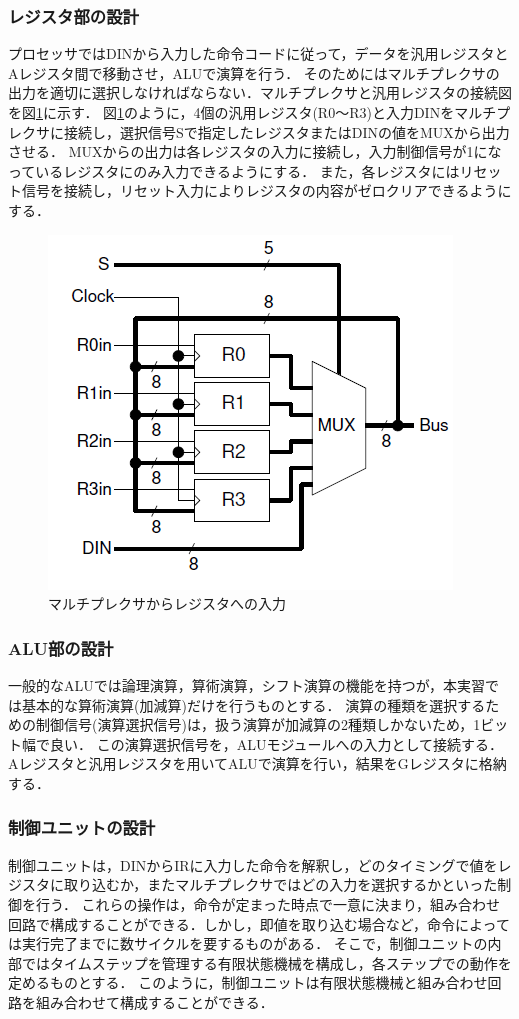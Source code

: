 \documentclass{jlreq}
\numberwithin{equation}{section}
\begin{document}
\subsubsection{レジスタ部の設計}
プロセッサではDINから入力した命令コードに従って，データを汎用レジスタとAレジスタ間で移動させ，ALUで演算を行う．
そのためにはマルチプレクサの出力を適切に選択しなければならない．マルチプレクサと汎用レジスタの接続図を図\ref{fig:mux_to_register}に示す．
図\ref{fig:mux_to_register}のように，4個の汎用レジスタ(R0～R3)と入力DINをマルチプレクサに接続し，選択信号Sで指定したレジスタまたはDINの値をMUXから出力させる．
MUXからの出力は各レジスタの入力に接続し，入力制御信号が1になっているレジスタにのみ入力できるようにする．
また，各レジスタにはリセット信号を接続し，リセット入力によりレジスタの内容がゼロクリアできるようにする．
\begin{figure}[H]
	\centering
	\includegraphics{assets/mux_to_register.png}
	\caption{マルチプレクサからレジスタへの入力}
	\label{fig:mux_to_register}
\end{figure}

\subsubsection{ALU部の設計}
一般的なALUでは論理演算，算術演算，シフト演算の機能を持つが，本実習では基本的な算術演算(加減算)だけを行うものとする．
演算の種類を選択するための制御信号(演算選択信号)は，扱う演算が加減算の2種類しかないため，1ビット幅で良い．
この演算選択信号を，ALUモジュールへの入力として接続する．
Aレジスタと汎用レジスタを用いてALUで演算を行い，結果をGレジスタに格納する．

\subsubsection{制御ユニットの設計}
制御ユニットは，DINからIRに入力した命令を解釈し，どのタイミングで値をレジスタに取り込むか，またマルチプレクサではどの入力を選択するかといった制御を行う．
これらの操作は，命令が定まった時点で一意に決まり，組み合わせ回路で構成することができる．しかし，即値を取り込む場合など，命令によっては実行完了までに数サイクルを要するものがある．
そこで，制御ユニットの内部ではタイムステップを管理する有限状態機械を構成し，各ステップでの動作を定めるものとする．
このように，制御ユニットは有限状態機械と組み合わせ回路を組み合わせて構成することができる．
\end{document}
